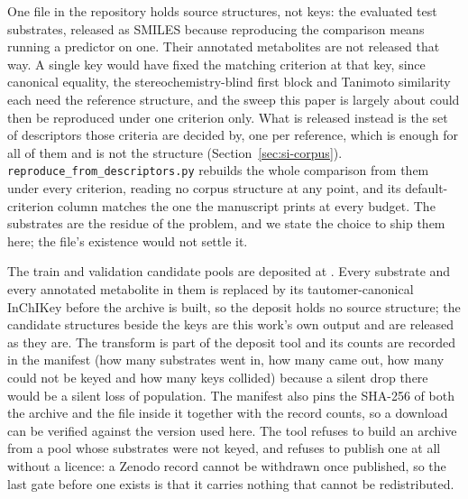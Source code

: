 \documentclass[journal=jcisd8,manuscript=suppinfo,layout=onecolumn]{achemso}
\begin{document}
One file in the repository holds source structures, not keys: the evaluated test
substrates, released as SMILES because reproducing the comparison means running a predictor on
one. Their annotated metabolites are not released that way. A single key would have fixed the
matching criterion at that key, since canonical equality, the stereochemistry-blind first block
and Tanimoto similarity each need the reference structure, and the sweep this paper is largely
about could then be reproduced under one criterion only. What is released instead is the set of
descriptors those criteria are decided by, one per reference, which is enough for all
\numCritCriteria{} of them and is not the structure
(Section~\ref{sec:si-corpus}). \texttt{reproduce\_from\_descriptors.py} rebuilds the whole
comparison from them under every criterion, reading no corpus structure at any point, and its
default-criterion column matches the one the manuscript prints at every budget. The substrates are
the residue of the problem, and we state the choice to ship them here; the file's existence
would not settle it.

The train and validation candidate pools are deposited at \ZenodoDoi{}. Every substrate and
every annotated metabolite in them is replaced by its tautomer-canonical InChIKey before the
archive is built, so the deposit holds no source structure; the candidate structures beside the
keys are this work's own output and are released as they are. The transform is part of the
deposit tool and its counts are recorded in the manifest (how many substrates went in, how
many came out, how many could not be keyed and how many keys collided) because a silent drop
there would be a silent loss of population. The manifest also pins the SHA-256 of both the
archive and the file inside it together with the record counts, so a download can be verified
against the version used here. The tool refuses to build an archive from a pool whose substrates
were not keyed, and refuses to publish one at all without a licence: a Zenodo record cannot be
withdrawn once published, so the last gate before one exists is that it carries nothing that
cannot be redistributed.


\end{document}
